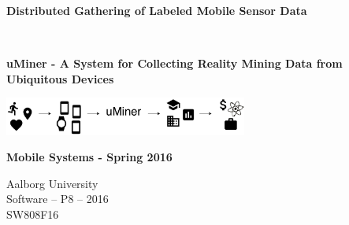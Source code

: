 
\begin{center}
	
	\vspace{8cm}

	\begin{spacing}{2.1}
		\begin{Huge}
			\textbf{Distributed Gathering of Labeled Mobile Sensor Data}
		\end{Huge}
		\\
		\vspace{0.6cm}
		\begin{huge}
			\textbf{uMiner - A System for Collecting Reality Mining Data from Ubiquitous Devices}
		\end{huge}
	\end{spacing}

	\vspace{0.6cm}
	
	\includegraphics[width=0.6\textwidth]{graphic/miscellaneous/front_page}

	\begin{large} 
		\textbf{Mobile Systems - Spring 2016}
	\end{large}

	\vspace*{\fill}

	Aalborg University		\\
	Software -- P8 -- 2016	\\
	SW808F16				\\

\end{center}



\thispagestyle{empty}
